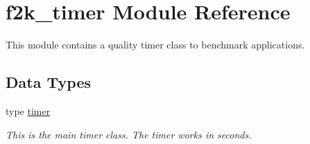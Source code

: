 \hypertarget{namespacef2k__timer}{}\section{f2k\+\_\+timer Module Reference}
\label{namespacef2k__timer}


This module contains a quality timer class to benchmark applications.  


\subsection*{Data Types}
\begin{DoxyCompactItemize}
\item 
type \hyperlink{structf2k__timer_1_1timer}{timer}
\begin{DoxyCompactList}\small\item\em This is the main timer class. The timer works in seconds. \end{DoxyCompactList}\end{DoxyCompactItemize}
